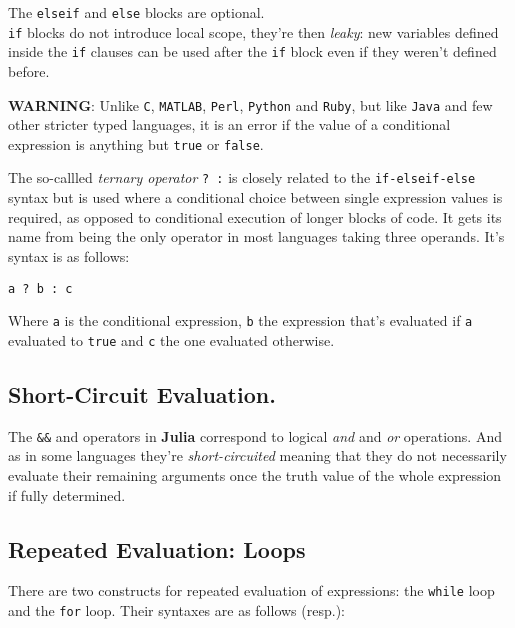 \documentclass[
]{article}
\begin{document}
The \texttt{elseif} and \texttt{else} blocks are optional.\\
\texttt{if} blocks do not introduce local scope, they're then
\emph{leaky}: new variables defined inside the \texttt{if} clauses can
be used after the \texttt{if} block even if they weren't defined before.

\textbf{WARNING}: Unlike \texttt{C}, \texttt{MATLAB}, \texttt{Perl},
\texttt{Python} and \texttt{Ruby}, but like \texttt{Java} and few other
stricter typed languages, it is an error if the value of a conditional
expression is anything but \texttt{true} or \texttt{false}.

The so-callled \emph{ternary operator} \texttt{?\ :} is closely related
to the \texttt{if-elseif-else} syntax but is used where a conditional
choice between single expression values is required, as opposed to
conditional execution of longer blocks of code. It gets its name from
being the only operator in most languages taking three operands. It's
syntax is as follows:

\begin{verbatim}
a ? b : c
\end{verbatim}

Where \texttt{a} is the conditional expression, \texttt{b} the
expression that's evaluated if \texttt{a} evaluated to \texttt{true} and
\texttt{c} the one evaluated otherwise.

\hypertarget{short-circuit-evaluation.}{%
\subsection{\texorpdfstring{\textbf{Short-Circuit
Evaluation}.}{Short-Circuit Evaluation.}}\label{short-circuit-evaluation.}}

The \texttt{\&\&} and \texttt{\textbar{}\textbar{}} operators in
\textbf{Julia} correspond to logical \emph{and} and \emph{or}
operations. And as in some languages they're \emph{short-circuited}
meaning that they do not necessarily evaluate their remaining arguments
once the truth value of the whole expression if fully determined.

\hypertarget{repeated-evaluation-loops}{%
\subsection{\texorpdfstring{\textbf{Repeated Evaluation:
Loops}}{Repeated Evaluation: Loops}}\label{repeated-evaluation-loops}}

There are two constructs for repeated evaluation of expressions: the
\texttt{while} loop and the \texttt{for} loop. Their syntaxes are as
follows (resp.):
\end{document}
